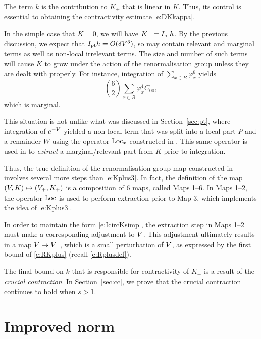 The term $k$ is the contribution to $K_+$ that is linear in $K$. Thus, its
control is essential to obtaining the contractivity estimate \eqref{e:DKkappa}.

In the simple case that $K = 0$, we will have $K_+ = I_{\rm pt} h$. By the previous
discussion, we expect that $I_{\rm pt} h = O(\delta V^3)$, so may contain relevant
and marginal terms as well as non-local irrelevant terms. The size and number
of such terms will cause $K$ to grow under the action of the renormalisation
group unless they are dealt with properly. For instance, integration of
$\sum_{x\in B} \varphi_x^6$ yields
\begin{equation}
\binom{6}{2} \sum_{x\in B} \varphi_x^4 C_{00},
\end{equation}
which is marginal.

This situation is not unlike what was discussed in Section~\ref{sec:pt}, where
integration of $e^{-V}$ yielded a non-local term that was split into a local
part $P$ and a remainder $W$ using the operator $\operatorname{Loc}_x$ constructed in
\cite{BBS-rg-pt}. This same operator is used in \cite{BS-rg-step} to \emph{extract}
a marginal/relevant part from $K$ prior to integration.

Thus, the true definition of the renormalisation group map constructed in
\cite{BS-rg-step} involves several more steps than \eqref{e:Kplus3}. In fact,
the definition of the map $(V, K) \mapsto (V_+, K_+)$ is a composition of
$6$ maps, called Maps 1--6. In Maps 1--2, the operator $\operatorname{Loc}$ is used to perform
extraction prior to Map 3, which implements the idea of \eqref{e:Kplus3}.

In order to maintain the form \eqref{e:IcircKsimp}, the extraction step in Maps 1--2
must make
a corresponding adjustment to $V$. This adjustment ultimately results in a
map $V \mapsto V_+$, which is a small perturbation of $V$, as expressed
by the first bound of \eqref{e:RKplus} (recall \eqref{e:Rplusdef}).

The final bound on $k$ that is responsible for contractivity of $K_+$ is a result
of the \emph{crucial contraction}. In Section~\ref{sec:cc}, we prove that the
crucial contraction continues to hold when $s > 1$.


\section{Improved norm}
\label{sec:Rpf1}

